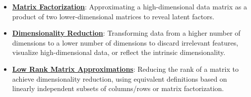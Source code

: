 \documentclass{article}%
\begin{document}
\begin{itemize}[leftmargin=*]
\item \href{https://purdue.brightspace.com/d2l/common/assets/pdfjs-d2l-dist/1.0.14-legacy/web/viewer.html?file=%2Fcontent%2Fenforced%2F1095467-wl.202510.CS.24300.001%2F11L2-svd-pca-recommender.pdf%3Fou%3D1095467&lang=en-us&container=d2l-fileviewer-rendered-pdf&fullscreen=d2l-fileviewer-rendered-pdf-dialog&height=667#page=13}{\textbf{Matrix Factorization}}: Approximating a high-dimensional data matrix as a product of two lower-dimensional matrices to reveal latent factors.%
\item \href{https://purdue.brightspace.com/d2l/common/assets/pdfjs-d2l-dist/1.0.14-legacy/web/viewer.html?file=%2Fcontent%2Fenforced%2F1095467-wl.202510.CS.24300.001%2F11L2-svd-pca-recommender.pdf%3Fou%3D1095467&lang=en-us&container=d2l-fileviewer-rendered-pdf&fullscreen=d2l-fileviewer-rendered-pdf-dialog&height=667#page=8}{\textbf{Dimensionality Reduction}}: Transforming data from a higher number of dimensions to a lower number of dimensions to discard irrelevant features, visualize high-dimensional data, or reflect the intrinsic dimensionality.%
\item \href{https://purdue.brightspace.com/d2l/common/assets/pdfjs-d2l-dist/1.0.14-legacy/web/viewer.html?file=%2Fcontent%2Fenforced%2F1095467-wl.202510.CS.24300.001%2F11L2-svd-pca-recommender.pdf%3Fou%3D1095467&lang=en-us&container=d2l-fileviewer-rendered-pdf&fullscreen=d2l-fileviewer-rendered-pdf-dialog&height=667#page=9}{\textbf{Low Rank Matrix Approximations}}: Reducing the rank of a matrix to achieve dimensionality reduction, using equivalent definitions based on linearly independent subsets of columns/rows or matrix factorization.%
\end{itemize}

%
\end{document}
